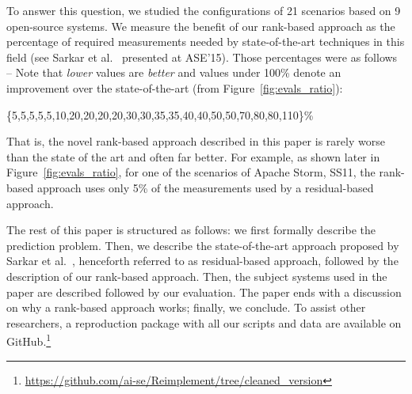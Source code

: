 To answer this question, we studied the configurations of 21 scenarios based on 9 open-source systems.
We measure the benefit of our rank-based approach
as  the percentage of required measurements
needed by state-of-the-art techniques in this field (see Sarkar et al.~\cite{sarkar2015cost} presented at ASE'15). Those percentages were as follows -- 
Note that {\em lower} values are {\em better} and values under 100\% denote
an improvement over  the state-of-the-art (from Figure~\ref{fig:evals_ratio}):  

\begin{center}
\{5,5,5,5,5,10,20,20,20,20,30,30,35,35,40,40,50,50,70,80,80,110\}\%
\end{center}

\noindent
That is, the novel rank-based approach described in this paper is rarely worse than the  state of the art and often far better. For example, as shown later in Figure~\ref{fig:evals_ratio}, for one of the scenarios of Apache Storm, SS11, the rank-based approach uses only 5\% of the measurements used by a residual-based approach.

The rest of this paper is structured as follows: we first formally describe the prediction problem. Then, we describe the state-of-the-art approach proposed by Sarkar et al.~\cite{sarkar2015cost}, henceforth referred to as residual-based approach, followed by the description of our rank-based approach. Then, the subject systems used in the paper are described followed by our evaluation. The paper ends with a discussion on why a rank-based approach works; finally, we conclude.
To assist other researchers, a reproduction package with all our scripts and data are available
on GitHub.\footnote{
\url{https://github.com/ai-se/Reimplement/tree/cleaned_version}
}



